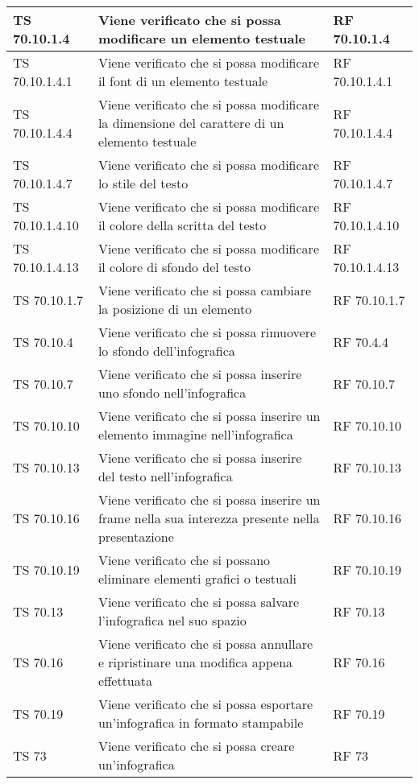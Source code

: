 {{\begin{longtable} [c]{| p{3cm} | p{6cm} |p{3cm}|}
			\hline
			TS 70.10.1.4 & Viene verificato che si possa modificare un elemento testuale  & RF 70.10.1.4\\
			\hline
			TS 70.10.1.4.1 & Viene verificato che si possa modificare il font\ped{g} di un elemento testuale & RF 70.10.1.4.1\\
			\hline
			TS 70.10.1.4.4 & Viene verificato che si possa modificare la dimensione del carattere di un elemento testuale & RF 70.10.1.4.4\\
			\hline
			TS 70.10.1.4.7 & Viene verificato che si possa modificare lo stile del testo & RF 70.10.1.4.7\\
			\hline
			TS 70.10.1.4.10 & Viene verificato che si possa modificare il colore della scritta del testo & RF 70.10.1.4.10\\
			\hline
			TS 70.10.1.4.13 & Viene verificato che si possa modificare il colore di sfondo del testo & RF 70.10.1.4.13\\
			\hline
			TS 70.10.1.7 & Viene verificato che si possa cambiare la posizione di un elemento & RF 70.10.1.7\\
			\hline
			TS 70.10.4 & Viene verificato che si possa rimuovere lo sfondo dell'infografica\ped{g} & RF 70.4.4\\
			\hline
			TS 70.10.7 & Viene verificato che si possa inserire uno sfondo nell'infografica\ped{g} & RF 70.10.7\\
			\hline
			TS 70.10.10 & Viene verificato che si possa inserire un elemento immagine nell'infografica\ped{g} & RF 70.10.10\\
			\hline
			TS 70.10.13 & Viene verificato che si possa inserire del testo nell'infografica\ped{g} & RF 70.10.13\\
			\hline
			TS 70.10.16 & Viene verificato che si possa inserire un frame\ped{g} nella sua interezza presente nella presentazione & RF 70.10.16\\
			\hline
			TS 70.10.19 & Viene verificato che si possano eliminare elementi grafici o testuali & RF 70.10.19\\
			\hline
			TS 70.13 & Viene verificato che si possa salvare l'infografica\ped{g} nel suo spazio & RF 70.13\\
			\hline
			TS 70.16 & Viene verificato che si possa annullare e ripristinare una modifica appena effettuata & RF 70.16\\
			\hline
			TS 70.19 & Viene verificato che si possa esportare un'infografica\ped{g} in formato stampabile & RF 70.19\\
			\hline
			TS 73 & Viene verificato che si possa creare un'infografica\ped{g} & RF 73\\
			\hline
\end{longtable}

}}
